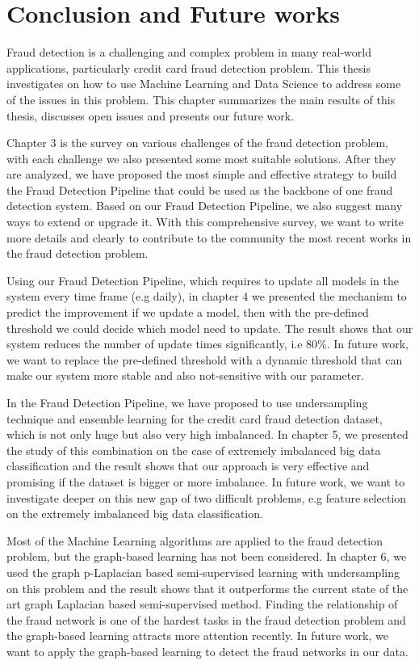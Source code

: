 \chapter{Conclusion and Future works}

\ifpdf
    \graphicspath{{Chapter1/Figs/Raster/}{Chapter1/Figs/PDF/}{Chapter1/Figs/}}
\else
    \graphicspath{{Chapter1/Figs/Vector/}{Chapter1/Figs/}}
\fi

Fraud detection is a challenging and complex problem in many real-world applications, particularly credit card fraud detection problem. This thesis investigates on how to use Machine Learning and Data Science to address some of the issues in this problem. This chapter summarizes the main results of this thesis, discusses open issues and presents our future work.

Chapter 3 is the survey on various challenges of the fraud detection problem, with each challenge we also presented some most suitable solutions. After they are analyzed, we have proposed the most simple and effective strategy to build the Fraud Detection Pipeline that could be used as the backbone of one fraud detection system. Based on our Fraud Detection Pipeline, we also suggest many ways to extend or upgrade it. With this comprehensive survey, we want to write more details and clearly to contribute to the community the most recent works in the fraud detection problem.

Using our Fraud Detection Pipeline, which requires to update all models in the system every time frame (e.g daily), in chapter 4 we presented the mechanism to predict the improvement if we update a model, then with the pre-defined threshold we could decide which model need to update. The result shows that our system reduces the number of update times significantly, i.e 80\%. In future work, we want to replace the pre-defined threshold with a dynamic threshold that can make our system more stable and also not-sensitive with our parameter.

In the Fraud Detection Pipeline, we have proposed to use undersampling technique and ensemble learning for the credit card fraud detection dataset, which is not only huge but also very high imbalanced. In chapter 5, we presented the study of this combination on the case of extremely imbalanced big data classification and the result shows that our approach is very effective and promising if the dataset is bigger or more imbalance. In future work, we want to investigate deeper on this new gap of two difficult problems, e.g feature selection on the extremely imbalanced big data classification.

Most of the Machine Learning algorithms are applied to the fraud detection problem, but the graph-based learning has not been considered. In chapter 6, we used the graph p-Laplacian based semi-supervised learning with undersampling on this problem and the result shows that it outperforms the current state of the art graph Laplacian based semi-supervised method. Finding the relationship of the fraud network is one of the hardest tasks in the fraud detection problem and the graph-based learning attracts more attention recently. In future work, we want to apply the graph-based learning to detect the fraud networks in our data.

